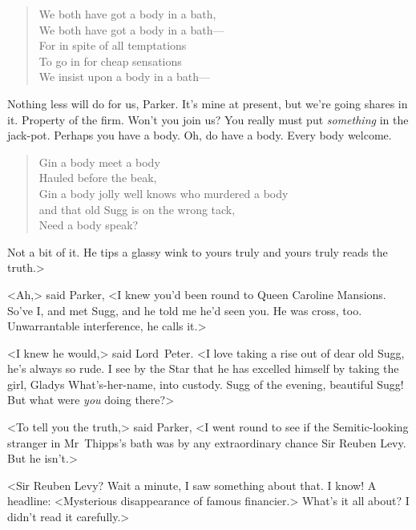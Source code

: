 \begin{verse}
We both have got a body in a bath,\\
We both have got a body in a bath—\\
For in spite of all temptations\\
To go in for cheap sensations\\
We insist upon a body in a bath—\\
\end{verse}

Nothing less will do for us, Parker. It's mine at present, but we're going shares in it. Property of the firm. Won't you join us? You really must put \textit{something} in the jack-pot. Perhaps you have a body. Oh, do have a body. Every body welcome.

\begin{verse}
Gin a body meet a body\\
Hauled before the beak,\\
Gin a body jolly well knows who murdered a body\\
and that old Sugg is on the wrong tack,\\
Need a body speak?
\end{verse}

Not a bit of it. He tips a glassy wink to yours truly and yours truly reads the truth.>

<Ah,> said Parker, <I knew you'd been round to Queen Caroline Mansions. So've I\@, and met Sugg, and he told me he'd seen you. He was cross, too. Unwarrantable interference, he calls it.>

<I knew he would,> said Lord~Peter. <I love taking a rise out of dear old Sugg, he's always so rude. I see by the Star that he has excelled himself by taking the girl, Gladys What's-her-name, into custody. Sugg of the evening, beautiful Sugg! But what were \textit{you} doing there?>

<To tell you the truth,> said Parker, <I went round to see if the Semitic-looking stranger in Mr~Thipps's bath was by any extraordinary chance Sir Reuben Levy. But he isn't.>

<Sir Reuben Levy? Wait a minute, I saw something about that. I know! A headline: <Mysterious disappearance of famous financier.> What's it all about? I didn't read it carefully.>

